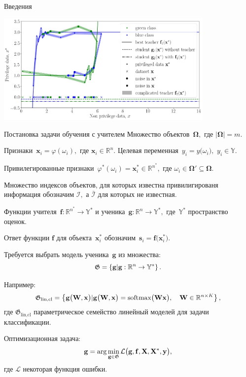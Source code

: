 \documentclass[10pt,pdf,hyperref={unicode}]{beamer}
\begin{document}
\begin{frame}{Введения}
\justifying
\begin{center}
	\includegraphics[width=0.8\textwidth]{figures/explanation}
\end{center}
\end{frame}
\begin{frame}{Постановка задачи обучения с учителем}
\justifying
Множество объектов~$\bm{\Omega},$ где $\left|\bm{\Omega}\right| = m$.

Признаки~$\mathbf{x}_i = \varphi(\omega_i),$ где $\mathbf{x}_i \in \mathbb{R}^{n}$.
Целевая переменная~$y_i = y\bigr(\omega_i\bigr),$ $y_i \in \mathbb{Y}$.

Привилегированные признаки~$\varphi^*(\omega_i)=\mathbf{x}^*_i \in \mathbb{R}^{n^*},$ где  $\omega_i\in \bm{\Omega}' \subseteq \bm{\Omega}$.

Множество индексов объектов, для которых известна привилигированя информация обозначим $\mathcal{I},$ а $\bar{\mathcal{I}}$ для которых не известная.

Функции учителя~$\mathbf{f}:\mathbb{R}^{n^*} \to \mathbb{Y}^*$ и ученика~$\mathbf{g}:\mathbb{R}^{n} \to \mathbb{Y}^*,$ где~$\mathbb{Y}^*$ пространство оценок.

Ответ функции $\mathbf{f}$ для объекта~$\mathbf{x}^*_i$ обозначим~$\mathbf{s}_i = \mathbf{f}\bigr(\mathbf{x}_i^*\bigr)$.

Требуется выбрать модель ученика~$\mathbf{g}$ из множества:
\[
\setlength\abovedisplayskip{0pt}
	\mathfrak{G} = \left\{\mathbf{g}| \mathbf{g}:\mathbb{R}^{n} \to \mathbb{Y}^*\right\}.
\setlength\belowdisplayskip{0pt}
\]

Например: 
\[
\setlength\abovedisplayskip{0pt}
	\mathfrak{G}_\text{lin,cl} = \left\{\mathbf{g}\bigr(\mathbf{W}, \mathbf{x}\bigr)| \mathbf{g}\bigr(\mathbf{W}, \mathbf{x}\bigr) = \text{softmax}\bigr(\mathbf{W}\mathbf{x}\bigr), \quad \mathbf{W} \in \mathbb{R}^{n\times K}\right\},
\setlength\belowdisplayskip{0pt}
\]
где $\mathfrak{G}_\text{lin,cl}$ параметрическое семейство линейный моделей для задачи классификации.

Оптимизационная задача:
\[
\setlength\abovedisplayskip{0pt}
	\mathbf{g} = \arg\min_{\mathbf{g} \in \mathfrak{G}} \mathcal{L}\bigr(\mathbf{g}, \mathbf{f}, \mathbf{X}, \mathbf{X}^{*}, \mathbf{y}\bigr),
\setlength\belowdisplayskip{0pt}
\]
где $\mathcal{L}$ некоторая функция ошибки.
\end{frame}
\end{document}
